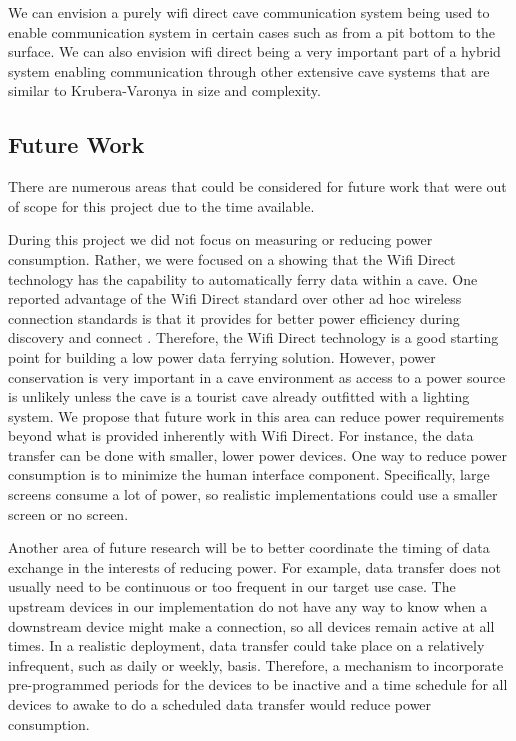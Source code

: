 \documentclass[10pt,twocolumn]{article}
\begin{document}
We can envision a purely wifi direct cave communication system being used to enable communication system in certain cases such as from a pit bottom to the surface.
We can also envision wifi direct being a very important part of a hybrid system enabling communication through other extensive cave systems that are similar to Krubera-Varonya in size and complexity. 

\subsection{Future Work}
There are numerous areas that could be considered for future work that were out of scope for this project due to the time available.

During this project we did not focus on measuring or reducing power consumption.
Rather, we were focused on a showing that the Wifi Direct technology has the capability to automatically ferry data within a cave.
One reported advantage of the Wifi Direct standard over other ad hoc wireless connection standards is that it provides for better power efficiency during discovery and connect \cite{wifiwhitepaper}.
Therefore, the Wifi Direct technology is a good starting point for building a low power data ferrying solution.
However, power conservation is very important in a cave environment as access to a power source is unlikely unless the cave is a tourist cave already outfitted with a lighting system.
We propose that future work in this area can reduce power requirements beyond what is provided inherently with Wifi Direct.
For instance, the data transfer can be done with smaller, lower power devices.
One way to reduce power consumption is to minimize the human interface component.
Specifically, large screens consume a lot of power, so realistic implementations could use a smaller screen or no screen.

Another area of future research will be to better coordinate the timing of data exchange in the interests of reducing power.
For example, data transfer does not usually need to be continuous or too frequent in our target use case.
The upstream devices in our implementation do not have any way to know when a downstream device might make a connection, 
so all devices remain active at all times.
In a realistic deployment, data transfer could take place on a relatively infrequent, such as daily or weekly, basis.
Therefore, a mechanism to incorporate pre-programmed periods for the devices to be inactive
and a time schedule for all devices to awake to do a scheduled data transfer would reduce power consumption.
\end{document}
